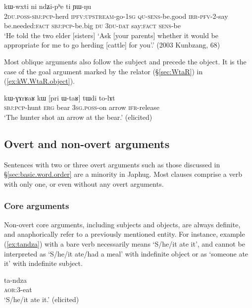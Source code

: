 \begin{exe}
\ex \label{ex:O.ndZiphe}
\gll [nɯ-kɯ-lɤɣ lu-ɕe-a ɯ-ɲɯ́-pe a-tɤ-tɯ-ti ra] kɯ-wxti ni ndʑi-pʰe ti ɲɯ-ŋu\\
\textsc{2du}.\textsc{poss}-\textsc{sbj}:\textsc{pcp}-herd \textsc{ipfv}:\textsc{upstream}-go-\textsc{1sg} \textsc{qu}-\textsc{sens}-be.good \textsc{irr}-\textsc{pfv}-2-say be.needed:\textsc{fact}  \textsc{sbj}:\textsc{pcp}-be.big \textsc{du} \textsc{3du}-\textsc{dat} say:\textsc{fact} \textsc{sens}-be\\
\glt `He told the two elder [sisters] `Ask [your parents] whether it would be appropriate for me to go herding [cattle] for you'.' (2003 Kunbzang, 68)
\end{exe}

Most oblique arguments also follow the subject and precede the object. It is the case of the goal argument marked by the relator  (§\ref{sec:WtaR}) in (\ref{ex:kW.WtaR.object}).

\begin{exe}
\ex \label{ex:kW.WtaR.object}
\gll  kɯ-ɣɤrʁaʁ kɯ [pri ɯ-taʁ] tɯdi to-lɤt \\
\textsc{sbj}:\textsc{pcp}-hunt \textsc{erg} bear \textsc{3sg}.\textsc{poss}-on arrow \textsc{ifr}-release \\
\glt `The hunter shot an arrow at the bear.' (elicited)
\end{exe}

\subsection{Overt and non-overt arguments} \label{sec:overt.non.overt}
Sentences with two or three overt arguments such as those discussed in §\ref{sec:basic.word.order} are a minority in Japhug. Most clauses comprise a verb with only one, or even without any overt arguments.

\subsubsection{Core arguments} \label{sec:nonovert.core.arguments}
Non-overt core arguments, including subjects and objects, are always definite, and anaphorically refer to a previously mentioned entity. For instance, example (\ref{ex:tandza}) with a bare verb necessarily means `S/he/it ate it', and cannot be interpreted as `S/he/it ate/had a meal' with indefinite object or as `someone ate it' with indefinite subject.

\begin{exe}
\ex \label{ex:tandza}
\gll ta-ndza \\
\textsc{aor}:3\flobv{}-eat \\
\glt `S/he/it ate it.' (elicited)
\end{exe}

